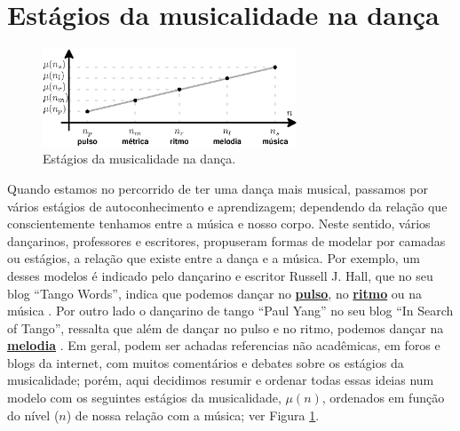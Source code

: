 
\newpage
\section{Estágios da musicalidade na dança}
\label{sec:aspectosusicalidade}

\begin{figure}
    \centering
    \includegraphics[width=0.675\textwidth]{chapters/cap-musicalidade-tecnica/temporallatex-aspectos-musica-latex.eps}
    \caption{Estágios da musicalidade na dança.}
    \label{fig:aspectos-musica-mu}
\end{figure}
Quando estamos no percorrido de ter uma dança mais musical,
passamos por vários estágios de autoconhecimento e aprendizagem; 
dependendo da relação que conscientemente tenhamos entre a música e nosso corpo.
Neste sentido, vários dançarinos, professores e escritores,
propuseram formas de modelar por camadas ou estágios, a relação que existe entre a dança e a música.
Por exemplo, um desses modelos é indicado pelo dançarino e escritor Russell J. Hall,
que no seu blog ``Tango Words'', 
indica que podemos dançar no \hyperref[ref:Pulso]{\textbf{pulso}}, 
no \hyperref[sec:pos:Ritmo]{\textbf{ritmo}} ou na música \cite{TangoWordsEstagiosMusicalidade1}.
Por outro lado o dançarino de tango ``Paul Yang'' no seu blog ``In Search of Tango'',
ressalta que além de dançar no pulso e no ritmo, 
podemos  dançar na \hyperref[sec:pos:Melodia]{\textbf{melodia}} \cite{InSearchOfTangoEstagiosMusicalidade1}.
Em geral, podem ser achadas referencias não acadêmicas, em foros e blogs da internet,
com muitos comentários e debates sobre os estágios da musicalidade;
porém, aqui decidimos resumir e ordenar todas essas ideias num modelo com os seguintes estágios da musicalidade, $\mu(n)$,
ordenados em função do nível ($n$) de nossa relação com a música; ver Figura \ref{fig:aspectos-musica-mu}.\\



